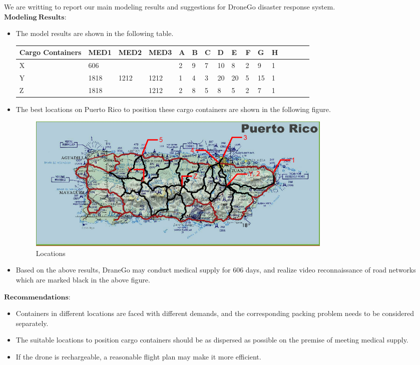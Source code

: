 \documentclass{mcmthesis}
\begin{document}
\noindent We are writting to report our main modeling results and suggestions for  DroneGo disaster response system.\\

\noindent$\mathbf{Modeling}\ \mathbf{Results:}$
\begin{itemize}
	\item The model results are shown in the following table.\\
	\begin{tabular}{llllllllllllllll}
		\hline	
		Cargo Containers&  MED1 & MED2 & MED3 & A & B & C & D & E & F & G & H \\
		\hline	 
		X & 606 & & &2 &9 & 7 & 10 & 8 & 2 &9 & 1\\  
		Y & 1818 & 1212 & 1212 &1 &4 & 3 & 20 & 20 & 5 &15 & 1\\    
		Z & 1818 &  & 1212 &2 &8 & 5 & 8 & 5 & 2 &7 & 1\\ 
		\hline
	\end{tabular}
	
	
	\item The best locations on Puerto Rico to position these cargo containers are shown in the following figure.\\
	
	\begin{figure}[h]
		\small
		\centering
		\includegraphics[width=15cm]{10.png}
		\caption{Locations} \label{fig:10}
	\end{figure}
	
	\item Based on the above results, DraneGo may conduct medical supply for 606 days, and realize video reconnaissance of road networks which are marked black in the above figure.\\
	
\end{itemize}
\newpage 
\noindent$\mathbf{Recommendations:}$
\begin{itemize}
	\item Containers in different locations are faced with different demands, and the corresponding packing problem needs to be considered separately. 
	\item The suitable locations to position cargo containers should be as dispersed as possible on the premise of meeting medical supply.
	\item If the drone is rechargeable, a reasonable flight plan may make it more efficient. 
\end{itemize}
\end{document}

